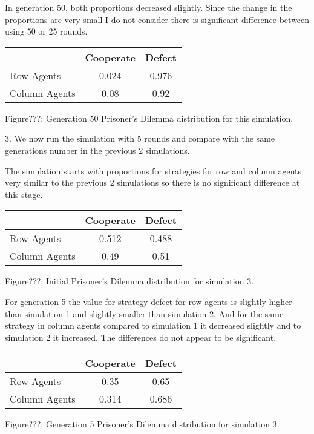 \documentclass{article}
\begin{document}
In generation 50, both proportions decreased slightly. Since the change in the proportions are very small I do not consider there is significant difference between using 50 or 25 rounds.
\begin{center}
\begin{tabular}{|l|c|c|}
\hline
& Cooperate & Defect \\ 
\hline
Row Agents & 0.024 & 0.976\\
\hline
Column Agents & 0.08 & 0.92\\
\hline
\end{tabular}
\end{center}
\begin{center}
Figure???: Generation 50 Prisoner’s Dilemma distribution for this simulation.
\end{center}

3. We now run the simulation with 5 rounds and compare with the same generations number in the previous 2 simulations.

The simulation starts with proportions for strategies for row and column agents very similar to the previous 2 simulations so there is no significant difference at this stage.
\begin{center}
\begin{tabular}{|l|c|c|}
\hline
& Cooperate & Defect \\ 
\hline
Row Agents & 0.512 & 0.488\\
\hline
Column Agents & 0.49 & 0.51\\
\hline
\end{tabular}
\end{center}
\begin{center}
Figure???: Initial Prisoner’s Dilemma distribution for simulation 3.
\end{center}

 For generation 5 the value for strategy defect for row agents is slightly higher than simulation 1 and slightly smaller than simulation 2. And for the same strategy in column agents compared to simulation 1 it decreased slightly and to simulation 2 it increased. The differences do not appear to be significant.
\begin{center}
\begin{tabular}{|l|c|c|}
\hline
& Cooperate & Defect \\ 
\hline
Row Agents & 0.35 & 0.65\\
\hline
Column Agents & 0.314 & 0.686\\
\hline
\end{tabular}
\end{center}
\begin{center}
Figure???: Generation 5 Prisoner’s Dilemma distribution for simulation 3.
\end{center}
\end{document}
